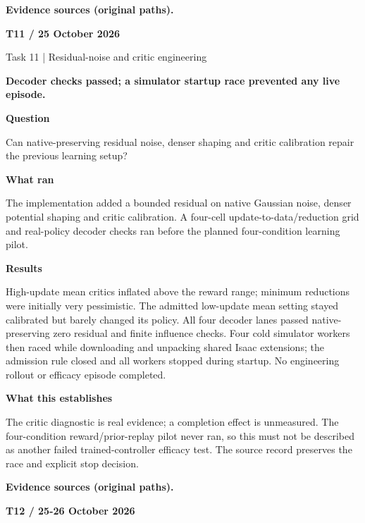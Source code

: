 \documentclass[11pt,a4paper]{article}
\newcommand{\block}[2]{\par\textbf{\color{ink}#1}\par\nopagebreak #2\par}
\newcommand{\finding}[1]{\begin{tcolorbox}[colback=pale,colframe=pale,boxrule=0pt,arc=1mm,left=10pt,right=10pt,top=10pt,bottom=10pt]\color{ink}\large\bfseries #1\end{tcolorbox}}
\begin{document}
\vfill{\footnotesize\color{muted}\textbf{Evidence sources (original paths).}\par
\raggedright {}\par {}}
\clearpage
{}\label{exp:T11}
{\color{accent}\small\bfseries T11 / 25 October 2026}\par
{}\par
{\color{muted}\small Task 11 | Residual-noise and critic engineering}\par\vspace{2mm}
\finding{Decoder checks passed; a simulator startup race prevented any live episode.}
\block{Question}{Can native-preserving residual noise, denser shaping and critic calibration repair the previous learning setup?}
\block{What ran}{The implementation added a bounded residual on native Gaussian noise, denser potential shaping and critic calibration. A four-cell update-to-data/reduction grid and real-policy decoder checks ran before the planned four-condition learning pilot.}
\block{Results}{High-update mean critics inflated above the reward range; minimum reductions were initially very pessimistic. The admitted low-update mean setting stayed calibrated but barely changed its policy. All four decoder lanes passed native-preserving zero residual and finite influence checks. Four cold simulator workers then raced while downloading and unpacking shared Isaac extensions; the admission rule closed and all workers stopped during startup. No engineering rollout or efficacy episode completed.}
\block{What this establishes}{The critic diagnostic is real evidence; a completion effect is unmeasured. The four-condition reward/prior-replay pilot never ran, so this must not be described as another failed trained-controller efficacy test. The source record preserves the race and explicit stop decision.}
\vfill{\footnotesize\color{muted}\textbf{Evidence sources (original paths).}\par
\raggedright {}\par {}}
\clearpage
{}\label{exp:T12}
{\color{accent}\small\bfseries T12 / 25-26 October 2026}\par
{}\par
\end{document}
